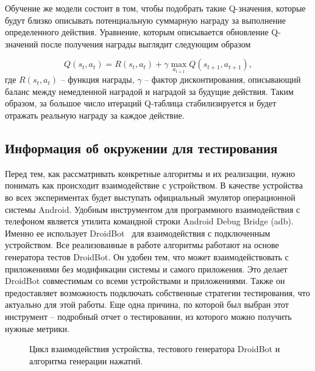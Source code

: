Обучение же модели состоит в том, чтобы подобрать такие Q-значения, которые будут близко описывать потенциальную суммарную награду за выполнение определенного действия. Уравнение, которым описывается обновление Q-значений после получения награды выглядит следующим образом

\begin{equation}
\label{eq_qlearning} 
{\displaystyle
Q(s_t, a_t) = R(s_t, a_t) + \gamma \max_{a_{t+1}}{Q(s_{t+1}, a_{t+1})} ,
}
\end{equation}
где $R(s_t, a_t)$ -- функция награды, $\gamma$ -- фактор дисконтирования, описывающий баланс между немедленной наградой и наградой за будущие действия. Таким образом, за большое число итераций Q-таблица стабилизируется и будет отражать реальную награду за каждое действие.


\subsection{Информация об окружении для тестирования}

Перед тем, как рассматривать конкретные алгоритмы и их реализации, нужно понимать как происходит взаимодействие с устройством. В качестве устройства во всех экспериментах будет выступать официальный эмулятор операционной системы Android. Удобным инструментом для программного взаимодействия с телефоном является утилита командной строки Android Debug Bridge (adb). Именно ее использует DroidBot~\cite{li2017droidbot} для взаимодействия с подключенным устройством. Все реализованные в работе алгоритмы работают на основе генератора тестов DroidBot. Он удобен тем, что может взаимодействовать с приложениями без модификации системы и самого приложения. Это делает DroidBot совместимым со всеми устройствами и приложениями. Также он предоставляет возможность подключать собственные стратегии тестирования, что актуально для этой работы. Еще одна причина, по которой был выбран этот инструмент -- подробный отчет о тестировании, из которого можно получить нужные метрики.

\begin{figure}[h]
\caption{Цикл взаимодействия устройства, тестового генератора DroidBot и алгоритма генерации нажатий.}
\label{InteractionScheme}
\end{figure}

